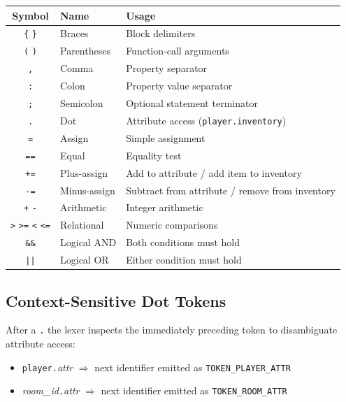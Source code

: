 \documentclass[12pt, a4paper]{article}
\begin{document}
\begin{center}
\begin{tabular}{cll}
\toprule
\textbf{Symbol} & \textbf{Name} & \textbf{Usage} \\
\midrule
\texttt{\{} \texttt{\}} & Braces & Block delimiters \\
\texttt{(} \texttt{)} & Parentheses & Function-call arguments \\
\texttt{,} & Comma & Property separator \\
\texttt{:} & Colon & Property value separator \\
\texttt{;} & Semicolon & Optional statement terminator \\
\texttt{.} & Dot & Attribute access (\texttt{player.inventory}) \\
\texttt{=} & Assign & Simple assignment \\
\texttt{==} & Equal & Equality test \\
\texttt{+=} & Plus-assign & Add to attribute / add item to inventory \\
\texttt{-=} & Minus-assign & Subtract from attribute / remove from inventory \\
\texttt{+} \texttt{-} & Arithmetic & Integer arithmetic \\
\texttt{>} \texttt{>=} \texttt{<} \texttt{<=} & Relational & Numeric comparisons \\
\texttt{\&\&} & Logical AND & Both conditions must hold \\
\texttt{||} & Logical OR & Either condition must hold \\
\bottomrule
\end{tabular}
\end{center}

\subsection{Context-Sensitive Dot Tokens}

After a \texttt{.} the lexer inspects the immediately preceding token to disambiguate
attribute access:

\begin{itemize}
  \item \texttt{player.}\textit{attr} $\Rightarrow$ next identifier emitted as \texttt{TOKEN\_PLAYER\_ATTR}
  \item \textit{room\_id}\texttt{.}\textit{attr} $\Rightarrow$ next identifier emitted as \texttt{TOKEN\_ROOM\_ATTR}
\end{itemize}
\end{document}
